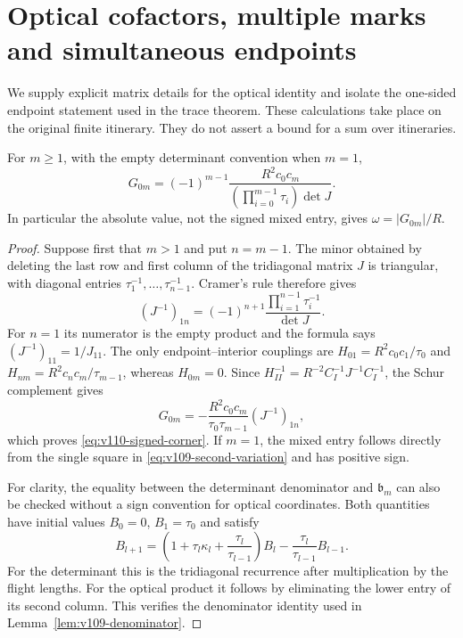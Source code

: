 \section{Optical cofactors, multiple marks and simultaneous endpoints}
\label{sec:v110-optical-audit}
We supply explicit matrix details for the optical identity and isolate
the one-sided endpoint statement used in the trace theorem. These
calculations take place on the original finite itinerary. They do
not assert a bound for a sum over itineraries.

\begin{lemma}
\label{lem:v110-cofactor}
For $m\ge1$, with the empty determinant convention when $m=1$,
\begin{equation}\label{eq:v110-signed-corner}
 G_{0m}=(-1)^{m-1}
       \frac{R^2c_0c_m}{(\prod_{i=0}^{m-1}\tau_i)\det J}.
\end{equation}
In particular the absolute value, not the signed mixed entry, gives
$\omega=|G_{0m}|/R$.
\end{lemma}
\begin{proof}
Suppose first that $m>1$ and put $n=m-1$. The minor obtained by
deleting the last row and first column of the tridiagonal matrix
$J$ is triangular, with diagonal entries
$\tau_1^{-1},\ldots,\tau_{n-1}^{-1}$. Cramer's rule therefore gives
\[
 (J^{-1})_{1n}=(-1)^{n+1}
                  \frac{\prod_{i=1}^{n-1}\tau_i^{-1}}{\det J}.
\]
For $n=1$ its numerator is the empty product and the formula says
$(J^{-1})_{11}=1/J_{11}$. The only endpoint--interior couplings are
$H_{01}=R^2c_0c_1/\tau_0$ and
$H_{nm}=R^2c_nc_m/\tau_{m-1}$, whereas $H_{0m}=0$.
Since $H_{II}^{-1}=R^{-2}C_I^{-1}J^{-1}C_I^{-1}$, the Schur
complement gives
\[
 G_{0m}=-\frac{R^2c_0c_m}{\tau_0\tau_{m-1}}(J^{-1})_{1n},
\]
which proves \eqref{eq:v110-signed-corner}. If $m=1$, the mixed
entry follows directly from the single square in
\eqref{eq:v109-second-variation} and has positive sign.

For clarity, the equality between the determinant denominator and
$\mathfrak b_m$ can also be checked without a sign convention for
optical coordinates. Both quantities have initial values
$B_0=0$, $B_1=\tau_0$ and satisfy
\[
 B_{l+1}=\left(1+\tau_l\kappa_l+
                      \frac{\tau_l}{\tau_{l-1}}\right)B_l
                         -\frac{\tau_l}{\tau_{l-1}}B_{l-1}.
\]
For the determinant this is the tridiagonal recurrence after
multiplication by the flight lengths. For the optical product it
follows by eliminating the lower entry of its second column.
This verifies the denominator identity used in
Lemma~\ref{lem:v109-denominator}.
\end{proof}

